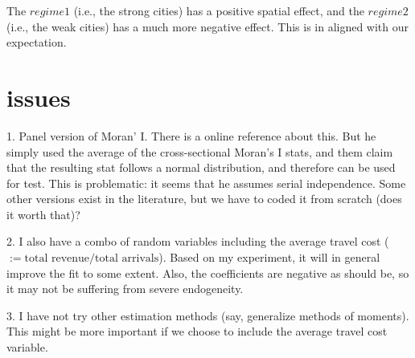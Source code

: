 \documentclass[11pt,a4paper]{amsart}
\theoremstyle{plain}
\theoremstyle{definition}
\begin{document}
The $regime1$ (i.e., the strong cities) has a positive spatial effect, and the $regime2$ (i.e., the weak cities) has a much more negative effect. This is in aligned with our expectation.

\section{issues}
1. Panel version of Moran' I. There is a online reference about this. But he simply used the average of the cross-sectional Moran's I stats, and them claim that the resulting stat follows a normal distribution, and therefore can be used for test. This is problematic: it seems that he assumes serial independence. Some other versions exist in the literature, but we have to coded it from scratch (does it worth that)? 

2. I also have a combo of random variables including the average travel cost ($:= \text{total revenue}/\text{total arrivals}$). Based on my experiment, it will in general improve the fit to some extent.  Also, the coefficients are negative as should be, so it may not be suffering from severe endogeneity. 

3. I have not try other estimation methods (say, generalize methods of moments). This might be more important if we choose to include the average travel cost variable.

		
\end{document}
